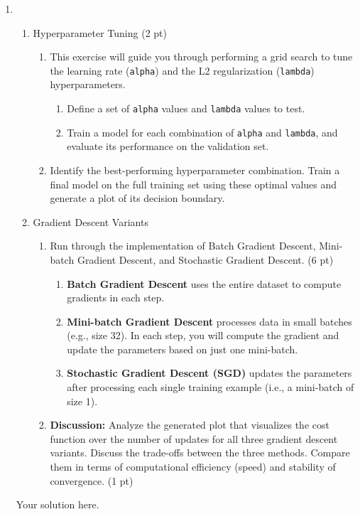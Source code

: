 \documentclass{article}
\theoremstyle{definition}
\theoremstyle{remark}
\newenvironment{Q}
        {%
          \clearpage
          \item
        }
        {%
          \phantom{s} %
          \bigskip
        }
\begin{document}
\begin{enumerate}[font={\Large\bfseries},left=0pt]
\begin{Q}
\begin{enumerate}
{\begin{enumerate}
\end{enumerate}
}
\item{Hyperparameter Tuning (2 pt)
\begin{enumerate}
    \item This exercise will guide you through performing a grid search to tune the learning rate (\texttt{alpha}) and the L2 regularization (\texttt{lambda}) hyperparameters.
    \begin{enumerate}
        \item Define a set of \texttt{alpha} values and \texttt{lambda} values to test.
        \item Train a model for each combination of \texttt{alpha} and \texttt{lambda}, and evaluate its performance on the validation set.
    \end{enumerate}
    \item Identify the best-performing hyperparameter combination. Train a final model on the full training set using these optimal values and generate a plot of its decision boundary.
\end{enumerate}
}
\item{Gradient Descent Variants 
\begin{enumerate}
    \item Run through the implementation of Batch Gradient Descent, Mini-batch Gradient Descent, and Stochastic Gradient Descent. (6 pt)
    \begin{enumerate}
        \item \textbf{Batch Gradient Descent} uses the entire dataset to compute gradients in each step. 
        \item \textbf{Mini-batch Gradient Descent} processes data in small batches (e.g., size 32). In each step, you will compute the gradient and update the parameters based on just one mini-batch.
        \item \textbf{Stochastic Gradient Descent (SGD)} updates the parameters after processing each single training example (i.e., a mini-batch of size 1).
    \end{enumerate}
    \item \textbf{Discussion:} Analyze the generated plot that visualizes the cost function over the number of updates for all three gradient descent variants. Discuss the trade-offs between the three methods. Compare them in terms of computational efficiency (speed) and stability of convergence. (1 pt)
\end{enumerate}
}
\end{enumerate}
\end{Q}
\begin{tcolorbox}
    Your solution here.
\end{tcolorbox}
\end{enumerate}
\end{document}
